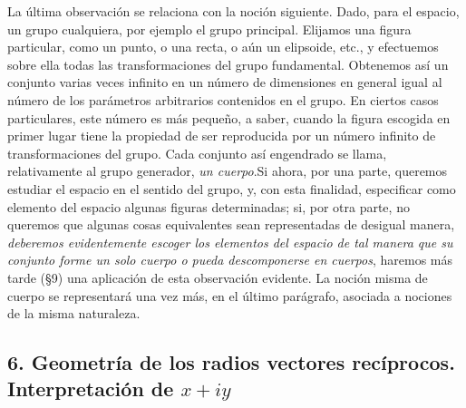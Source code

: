 \documentclass[a4paper, 12pt]{article}
\begin{document}
La última observación se relaciona con la noción siguiente. Dado, para el espacio, un grupo cualquiera, por ejemplo el grupo principal. Elijamos una figura particular, como un punto, o una recta, o aún un elipsoide, etc., y efectuemos sobre ella todas las transformaciones del grupo fundamental. Obtenemos así un conjunto varias veces infinito en un número de dimensiones en general igual al número de los parámetros arbitrarios contenidos en el grupo. En ciertos casos particulares, este número es más pequeño, a saber, cuando la figura escogida en primer lugar tiene la propiedad de ser reproducida por un número infinito de transformaciones del grupo. Cada conjunto así engendrado se llama, relativamente al grupo generador, \textit{un cuerpo}$. $Si ahora, por una parte, queremos estudiar el espacio en el sentido del grupo, y, con esta finalidad, especificar como elemento del espacio algunas figuras determinadas; si, por otra parte, no queremos que algunas cosas equivalentes sean representadas de desigual manera, \textit{deberemos evidentemente escoger los elementos del espacio de tal manera que su conjunto forme un solo cuerpo o pueda descomponerse en cuerpos}, haremos más tarde ({\S}9) una aplicación de esta observación evidente. La noción misma de cuerpo se representará una vez más, en el último parágrafo, asociada a nociones de la misma naturaleza. 

 \subsection*{6. Geometría de los radios vectores recíprocos. Interpretación de $x + iy$} 
\end{document}
